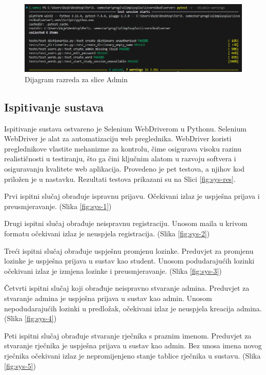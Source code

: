 \begin{figure}[htp]
	\includegraphics[scale=0.6]{slike/pytest_run.png}
	\centering
	\caption{Dijagram razreda za slice Admin}
	\label{fig:test-12}
\end{figure}

\eject
\pagebreak

			\subsection{Ispitivanje sustava}
Ispitivanje sustava ostvareno je Selenium WebDriverom u Pythonu. Selenium WebDriver je alat za automatizaciju web preglednika. WebDriver koristi preglednikove vlastite mehanizme za kontrolu, čime osigurava visoku razinu realističnosti u testiranju, što ga čini ključnim alatom u razvoju softvera i osiguravanju kvalitete web aplikacija. Provedeno je pet testova, a njihov kod priložen je u nastavku. Rezultati testova prikazani su na Slici \ref{fig:sys-res}.

\begin{packed_item}

    \item  Prvi ispitni slučaj obrađuje ispravnu prijavu. Očekivani izlaz je uspješna prijava i preusmjeravanje. (Slika \ref{fig:sys-1})
    \item Drugi ispitni slučaj obrađuje neispravnu registraciju. Unosom maila u krivom formatu očekivani izlaz je neuspjela registracija. (Slika \ref{fig:sys-2})
    \item Treći ispitni slučaj obrađuje uspješnu promjenu lozinke. Preduvjet za promjenu lozinke je uspješna prijava u sustav kao student. Unosom podudarajućih lozinki očekivani izlaz je izmjena lozinke i preusmjeravanje. (Slika \ref{fig:sys-3})
    \item Četvrti ispitni slučaj koji obrađuje neispravno stvaranje admina. Preduvjet za stvaranje admina je uspješna prijava u sustav kao admin. Unosom nepodudarajućih lozinki u predložak, očekivani izlaz je neuspjela kreacija admina. (Slika \ref{fig:sys-4})
    \item Peti ispitni slučaj obrađuje stvaranje rječnika s praznim imenom. Preduvjet za stvaranje rječnika je uspješna prijava u sustav kao admin. Bez unosa imena novog rječnika očekivani izlaz je nepromijenjeno stanje tablice rječnika u sustavu. (Slika \ref{fig:sys-5})
    
\end{packed_item}



